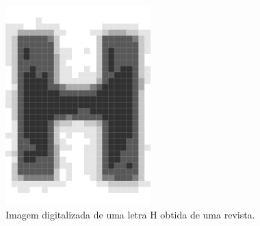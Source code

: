 \documentclass[a4paper,11pt]{article}
\begin{document}
      \begin{figure}[htb]
        \begin{center}
          \includegraphics[width=0.5\textwidth]{assets/binarization/h_3grayscale_big.png}
          \end{center}
        \caption{Imagem digitalizada de uma letra H obtida de uma revista.}
        \label{fig:letrah}
      \end{figure}
\end{document}
